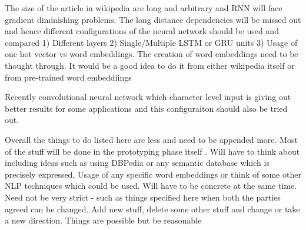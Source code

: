 \documentclass[a4paper, 11pt]{article}
\begin{document}
The size of the article in wikipedia are long and arbitrary and RNN will face gradient diminishing problems. The long distance dependencies will be missed out and hence different configurations of the neural network should be used and compared 
1) Different layers
2) Single/Multiple LSTM or GRU units
3) Usage of one hot vector vs word embeddings. The creation of word embeddings need to be thought through. It would be a good idea to do it from either wikipedia itself or from pre-trained word embeddiings


Recently convolutional neural network which character level input is giving out better results for some applications and this configuraiton should also be tried out.






\color{red}
Overall the things to do listed here are less and need to be appended more. Most of the stuff will be done in the prototyping phase itself . Will have to think about including ideas such as using DBPedia or any semantic database which is precisely expressed, Usage of any specific word embeddings or think of some other NLP techniques which could be used. Will have to be concrete at the same time. Need not be very strict - such as things specified here when both the parties agreed can be changed. Add new stuff, delete some other stuff and change or take a new direction. Things are possible but be reasonable
\end{document}
